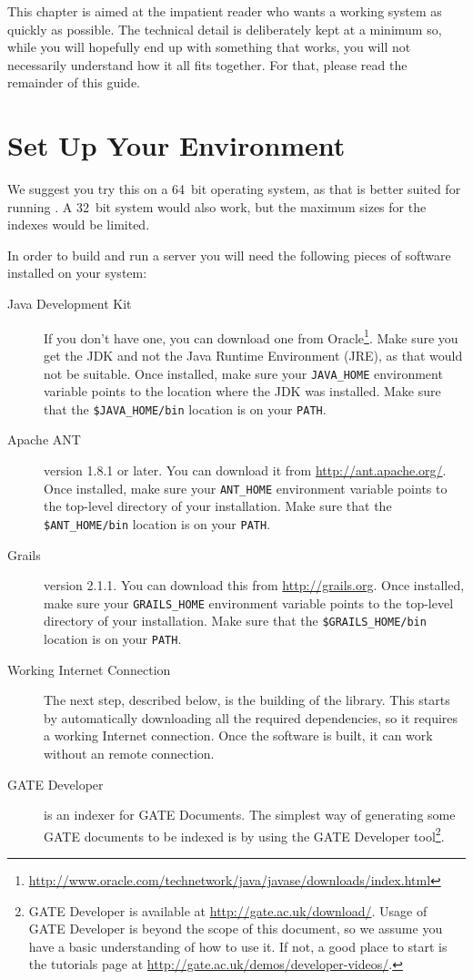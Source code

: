 This chapter is aimed at the impatient reader who wants a working system as
quickly as possible. The technical detail is deliberately kept at a minimum so,
while you will hopefully end up with something that works, you will not
necessarily understand how it all fits together. For that, please read the
remainder of this guide.

\section{Set Up Your Environment}
We suggest you try this on a 64~bit operating system, as that is better suited
for running \Mimir{}. A 32~bit system would also work, but the maximum sizes for
the indexes would be limited.

In order to build and run a \Mimir{} server you will need the following pieces
of software installed on your system:
\begin{description}
  \item[Java Development Kit] If you don't have one, you can download one from
  Oracle\footnote{\url{http://www.oracle.com/technetwork/java/javase/downloads/index.html}}.
  Make sure you get the JDK and not the Java Runtime Environment (JRE), as that
  would not be suitable. Once installed, make sure your \verb!JAVA_HOME!
  environment variable points to the location where the JDK was installed.  Make
  sure that the \verb!$JAVA_HOME/bin! location is on your \verb!PATH!.
  \item[Apache ANT] version 1.8.1 or later. You can download it from
  \url{http://ant.apache.org/}. Once installed, make sure your \verb!ANT_HOME!
  environment variable points to the top-level directory of your installation.
  Make  sure that the \verb!$ANT_HOME/bin! location is on your \verb!PATH!.
  \item[Grails] version 2.1.1. You can download this from
  \url{http://grails.org}. Once installed, make sure your \verb!GRAILS_HOME!
  environment variable points to the top-level directory of your installation.
  Make sure that the \verb!$GRAILS_HOME/bin! location is on your \verb!PATH!.
  \item[Working Internet Connection] The next step, described below, is the
  building of the \Mimir{} library. This starts by automatically downloading all
  the required dependencies, so it requires a working Internet connection. Once
  the software is built, it can work without an remote connection.
  \item[GATE Developer] \Mimir{} is an indexer for GATE Documents. The simplest
  way of generating some GATE documents to be indexed is by using the GATE
  Developer tool\footnote{GATE Developer is available at
  \url{http://gate.ac.uk/download/}. Usage of GATE Developer is beyond the scope
  of this document, so we assume you have a basic understanding of how to use
  it. If not, a good place to start is the tutorials page at
  \url{http://gate.ac.uk/demos/developer-videos/}.}. 
\end{description}
%
